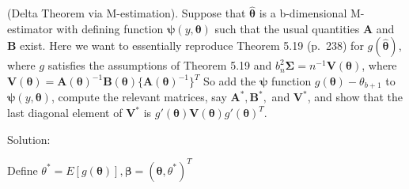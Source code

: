 \documentclass[
  letterpaper,
  DIV=11,
  numbers=noendperiod]{scrreprt}
\begin{document}
(Delta Theorem via M-estimation). Suppose that
\(\boldsymbol{\hat \theta}\) is a b-dimensional M-estimator with
defining function \(\boldsymbol \psi(y, \boldsymbol \theta)\) such that
the usual quantities \(\mathbf A\) and \(\mathbf B\) exist. Here we want
to essentially reproduce Theorem 5.19 (p.~238) for
\(g(\boldsymbol{\hat \theta})\), where \(g\) satisfies the assumptions
of Theorem 5.19 and
\(b_n^2 \boldsymbol \Sigma = n^{-1} \mathbf V(\boldsymbol \theta)\),
where
\(\mathbf V(\boldsymbol \theta )= \mathbf A(\boldsymbol \theta)^{-1} \mathbf B(\boldsymbol \theta)\{\mathbf A(\boldsymbol \theta)^{-1}\}^T\)
So add the \(\boldsymbol \psi\) function
\(g(\boldsymbol \theta) - \theta_{b+1}\) to
\(\boldsymbol \psi(y, \boldsymbol \theta)\), compute the relevant
matrices, say \(\mathbf {A}^* , \mathbf{B}^*,\) and \(\mathbf{V}^*\),
and show that the last diagonal element of \(\mathbf{V}^*\) is
\(g'(\boldsymbol \theta) \mathbf V(\boldsymbol \theta)g'(\boldsymbol \theta)^T\).

Solution:

Define
\(\theta^* = E[g(\boldsymbol \theta)], \boldsymbol \beta = (\boldsymbol \theta, \theta^*)^T\)
\end{document}
